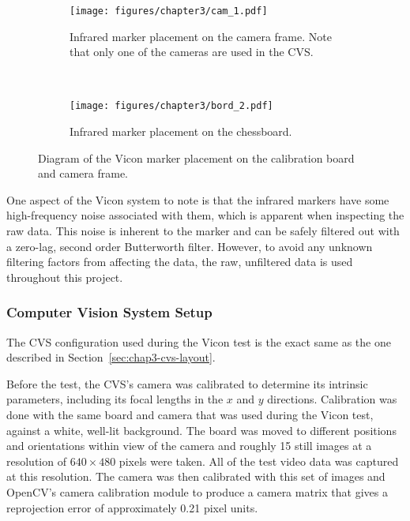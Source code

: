 \begin{figure}
  \centering 
  \begin{subfigure}[t]{0.48\textwidth}
    \centering
    \texttt{[image: figures/chapter3/cam\_1.pdf]}
    \caption[Infrared marker placement on the camera frame.]{Infrared marker placement on the camera frame. Note that only one of the cameras are used in the CVS.}
  \label{fig:chap3-cam-marker-placement}
  \end{subfigure}
  ~
  \begin{subfigure}[t]{0.48\textwidth}
    \centering
    \texttt{[image: figures/chapter3/bord\_2.pdf]}
    \caption{Infrared marker placement on the chessboard.}
  \label{fig:chap3-board-marker-placement}
  \end{subfigure}
\caption{Diagram of the Vicon marker placement on the calibration board and camera frame.}
\label{fig:chap3-vicon-marker-placement}
\end{figure}

One aspect of the Vicon system to note is that the infrared markers have some high-frequency noise associated with them, which is apparent when inspecting the raw data. This noise is inherent to the marker and can be safely filtered out with a zero-lag, second order Butterworth filter. However, to avoid any unknown filtering factors from affecting the data, the raw, unfiltered data is used throughout this project. 

\subsubsection{Computer Vision System Setup}

The CVS configuration used during the Vicon test is the exact same as the one described in Section~\ref{sec:chap3-cvs-layout}.

Before the test, the CVS's camera was calibrated to determine its intrinsic parameters, including its focal lengths in the $x$ and $y$ directions. Calibration was done with the same board and camera that was used during the Vicon test, against a white, well-lit background. The board was moved to different positions and orientations within view of the camera and roughly 15 still images at a resolution of $640\times480$ pixels were taken. All of the test video data was captured at this resolution. The camera was then calibrated with this set of images and OpenCV's camera calibration module to produce a camera matrix that gives a reprojection error of approximately 0.21 pixel units. 

